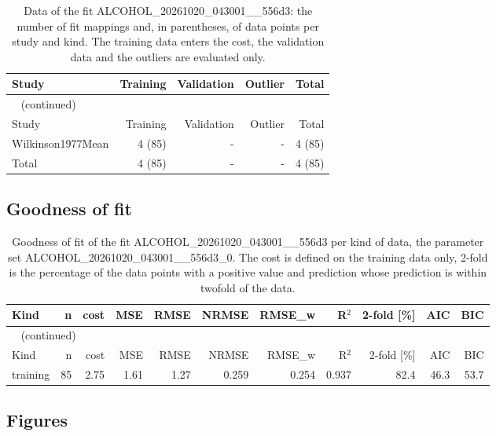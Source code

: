 \begin{longtable}{lrrrr}
\caption{Data of the fit ALCOHOL\_20261020\_043001\_\_556d3: the number of fit mappings and, in parentheses, of data points per study and kind. The training data enters the cost, the validation data and the outliers are evaluated only.}\label{tab:data:ALCOHOL_20261020_043001__556d3} \\
\toprule
Study & Training & Validation & Outlier & Total \\
\midrule
\endfirsthead
\multicolumn{5}{l}{\small\tablename~\thetable{} (continued)} \\
\toprule
Study & Training & Validation & Outlier & Total \\
\midrule
\endhead
\bottomrule
\endlastfoot
Wilkinson1977Mean & 4 (85) & - & - & 4 (85) \\
Total & 4 (85) & - & - & 4 (85) \\
\end{longtable}

\subsection{Goodness of fit}

\begin{longtable}{lrrrrrrrrrr}
\caption{Goodness of fit of the fit ALCOHOL\_20261020\_043001\_\_556d3 per kind of data, the parameter set ALCOHOL\_20261020\_043001\_\_556d3\_0. The cost is defined on the training data only, 2-fold is the percentage of the data points with a positive value and prediction whose prediction is within twofold of the data.}\label{tab:metrics:ALCOHOL_20261020_043001__556d3} \\
\toprule
Kind & n & cost & MSE & RMSE & NRMSE & RMSE\_w & R\ensuremath{^{2}} & 2-fold [\%] & AIC & BIC \\
\midrule
\endfirsthead
\multicolumn{11}{l}{\small\tablename~\thetable{} (continued)} \\
\toprule
Kind & n & cost & MSE & RMSE & NRMSE & RMSE\_w & R\ensuremath{^{2}} & 2-fold [\%] & AIC & BIC \\
\midrule
\endhead
\bottomrule
\endlastfoot
training & 85 & 2.75 & 1.61 & 1.27 & 0.259 & 0.254 & 0.937 & 82.4 & 46.3 & 53.7 \\
\end{longtable}

\subsection{Figures}

